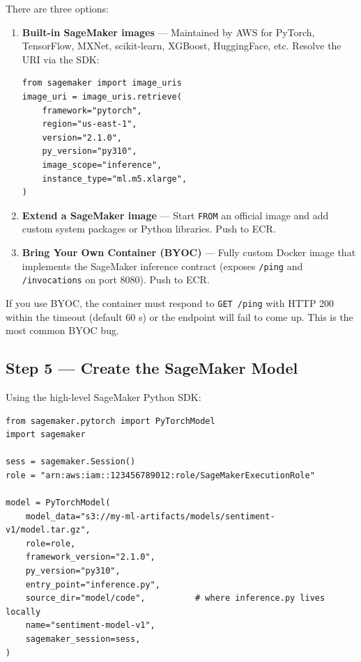 \documentclass[11pt,a4paper]{article}
\begin{document}
There are three options:

\begin{enumerate}[leftmargin=*]
    \item \textbf{Built-in SageMaker images} --- Maintained by AWS for PyTorch,
          TensorFlow, MXNet, scikit-learn, XGBoost, HuggingFace, etc. Resolve
          the URI via the SDK:
          \begin{lstlisting}[style=pycode]
from sagemaker import image_uris
image_uri = image_uris.retrieve(
    framework="pytorch",
    region="us-east-1",
    version="2.1.0",
    py_version="py310",
    image_scope="inference",
    instance_type="ml.m5.xlarge",
)
          \end{lstlisting}

    \item \textbf{Extend a SageMaker image} --- Start \texttt{FROM} an official
          image and add custom system packages or Python libraries. Push to ECR.

    \item \textbf{Bring Your Own Container (BYOC)} --- Fully custom Docker image
          that implements the SageMaker inference contract (exposes
          \texttt{/ping} and \texttt{/invocations} on port 8080). Push to ECR.
\end{enumerate}

\begin{warnbox}
If you use BYOC, the container must respond to \texttt{GET /ping} with
HTTP 200 within the timeout (default 60 s) or the endpoint will fail to come up.
This is the most common BYOC bug.
\end{warnbox}

\subsection{Step 5 --- Create the SageMaker Model}

Using the high-level SageMaker Python SDK:

\begin{lstlisting}[style=pycode]
from sagemaker.pytorch import PyTorchModel
import sagemaker

sess = sagemaker.Session()
role = "arn:aws:iam::123456789012:role/SageMakerExecutionRole"

model = PyTorchModel(
    model_data="s3://my-ml-artifacts/models/sentiment-v1/model.tar.gz",
    role=role,
    framework_version="2.1.0",
    py_version="py310",
    entry_point="inference.py",
    source_dir="model/code",          # where inference.py lives locally
    name="sentiment-model-v1",
    sagemaker_session=sess,
)
\end{lstlisting}
\end{document}
